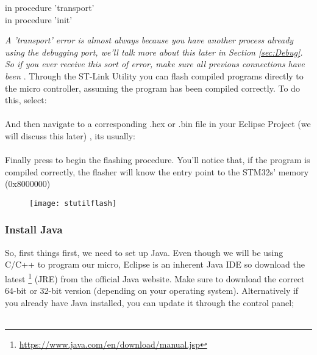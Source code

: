 {\color{Red}
in procedure 'transport'\\
in procedure 'init'{
\parindent=0pt
\par
\justifying
\color{Gray}\emph{ A 'transport' error is almost always because you have another process already using the debugging port, we'll talk more about this later in Section \ref{sec:Debug}. So if you ever receive this sort of error, make sure all previous connections have been \textbf{\underline{}}}.
\newpage
\justifying
\color{Black}
Through the ST-Link Utility you can flash compiled programs directly to the micro controller, assuming the program has been compiled correctly. To do this, select:\\
\-\ \hspace{20pt}
\\
And then navigate to a corresponding .hex or .bin file in your Eclipse Project (we will discuss this later) , its usually:\\ 
\\
Finally press  to begin the flashing procedure. You'll notice that, if the program is compiled correctly, the flasher will know the entry point to the STM32s' memory (0x8000000) 
\\
\begin{figure}[htbp]
\centering
\texttt{[image: stutilflash]}
\end{figure}
\justifying
\par
\subsubsection{Install Java}
So, first things first, we need to set up Java. Even though we will be using C/C++ to program our micro, Eclipse is an inherent Java IDE so download the latest \href{https://www.java.com/en/download/manual.jsp}{\color{Blue}\underline{}}\hspace{1pt}\footnote{\url{https://www.java.com/en/download/manual.jsp}} (JRE) from the official Java website. Make sure to download the correct 64-bit or 32-bit version (depending on your operating system). 
Alternatively if you already have Java installed, you can update it through the control panel;\\
\-\ \hspace{20pt}
}}
